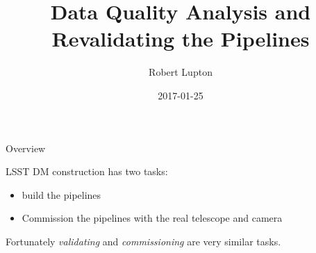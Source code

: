 \documentclass[t, xelatex]{beamer}
\author{Robert Lupton}
\date{2017-01-25}
\title{Data Quality Analysis and Revalidating the Pipelines}
\begin{document}
\maketitle

\begin{frame}{Overview}

LSST DM construction has two tasks:
\begin{itemize}
\item build the pipelines
\item Commission the pipelines with the real telescope and camera
\end{itemize}

\pause
Fortunately \emph{validating} and \emph{commissioning} are very similar tasks.

\end{frame}
\end{document}
